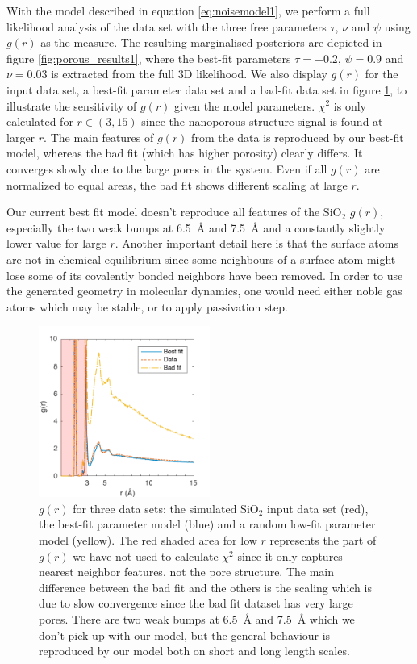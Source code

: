 \documentclass[aps,pre,twocolumn,letterpaper,floatfix,showpacs]{revtex4}
\begin{document}
With the model described in equation \ref{eq:noisemodel1}, we perform a full likelihood
analysis of the data set with the three free parameters $\tau$, $\nu$ and $\psi$ using $g(r)$ as the measure. 
The resulting marginalised posteriors are depicted in figure \ref{fig:porous_results1},
where the best-fit parameters $\tau=-0.2$, $\psi=0.9$ and $\nu=0.03$ is extracted from the full 3D likelihood. 
We also display $g(r)$ for the input data set, a best-fit parameter data set and a
bad-fit data set in figure \ref{fig:gofr1}, to illustrate the sensitivity of $g(r)$ given the model parameters.
$\chi^2$ is only calculated for $r\in (3,15)$ since the nanoporous structure signal is found at larger $r$.
The main features of $g(r)$ from the data is reproduced by our best-fit model, whereas the bad fit (which has higher porosity) clearly differs.
It converges slowly due to the large pores in the system. Even if all $g(r)$ are normalized to equal areas, the bad fit shows different scaling at large $r$.

Our current best fit model doesn't reproduce all features of the SiO$_2$ $g(r)$, especially the two weak bumps at \SI{6.5}{\angstrom} and \SI{7.5}{\angstrom} and a constantly slightly lower value for large $r$.
Another important detail here is that the surface atoms are not in chemical equilibrium since some neighbours of a surface atom might lose some of its covalently bonded neighbors have been removed. 
In order to use the generated geometry in molecular dynamics, one would need either noble gas atoms which may be stable, or to apply passivation step.

\begin{figure}
\includegraphics[width=0.5\textwidth]{fig8.pdf}
\caption{$g(r)$ for three data sets: the simulated SiO$_2$ input data set (red), the best-fit parameter model (blue) and a random low-fit parameter model (yellow).
The red shaded area for low $r$ represents the part of $g(r)$ we have not used to calculate $\chi^2$ since it only captures nearest neighbor features, not the pore structure.
The main difference between the bad fit and the others is the scaling which is due to slow convergence since the bad fit dataset has very large pores.
There are two weak bumps at \SI{6.5}{\angstrom} and \SI{7.5}{\angstrom} which we don't pick up with our model, but the general behaviour is reproduced by our model both on short and long length scales.}
\label{fig:gofr1}
\end{figure}
\end{document}
